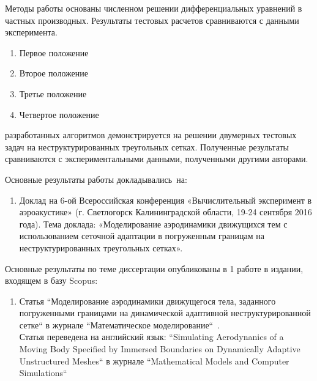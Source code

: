 {\methods} Методы работы основаны численном решении дифференциальных уравнений в частных производных. Результаты тестовых расчетов сравниваются с данными эксперимента.

{}
\begin{enumerate}
  \item Первое положение
  \item Второе положение
  \item Третье положение
  \item Четвертое положение
\end{enumerate}

{\reliability} разработанных алгоритмов демонстрируется на решении двумерных тестовых задач на неструктурированных треугольных сетках. Полученные результаты сравниваются с экспериментальными данными, полученными другими авторами.

{\probation}
Основные результаты работы докладывались~на:
\begin{enumerate}
	\item Доклад на 6-ой Всероссийская конференция «Вычислительный эксперимент в аэроакустике» (г. Светлогорск Калининградской области, 19-24 сентября 2016 года). Тема доклада: «Моделирование аэродинамики движущихся тем с использованием сеточной адаптации в погруженным границам на неструктурированных треугольных сетках».~\citeauthor{ceaa_2016}
\end{enumerate}

{\publications} Основные результаты по теме диссертации опубликованы в 1 работе в издании, входящем в базу Scopus:
\begin{enumerate}
	\item Статья ``Моделирование аэродинамики движущегося тела, заданного погруженными границами на динамической адаптивной неструктурированной сетке`` в журнале ``Математическое моделирование``~\citeauthor{abalakin2018russian}.\\
	Статья переведена на английский язык: ``Simulating Aerodynanics of a Moving Body Specified by Immersed Boundaries on Dynamically Adaptive Unstructured Meshes`` в журнале ``Mathematical Models and Computer Simulations``~\citeauthor{abalakin2019simulating}
\end{enumerate}

